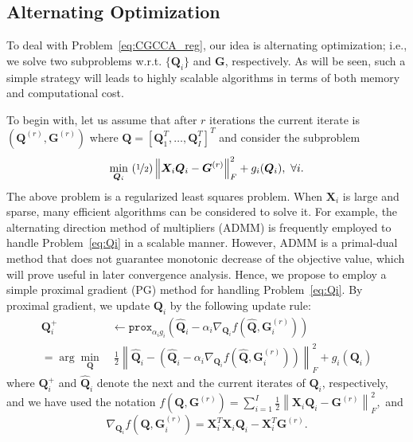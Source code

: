 \documentclass[10pt,journal]{IEEEtran}
\newcommand{\G}{\boldsymbol{G}}
\newcommand{\Q}{\boldsymbol{Q}}
\newcommand{\X}{\boldsymbol{X}}
\begin{document}
\subsection{Alternating Optimization}
To deal with Problem~\eqref{eq:CGCCA_reg}, our idea is alternating optimization; i.e.,
we solve two subproblems w.r.t. $\{\Q_i\}$ and $\G$, respectively.
As will be seen, such a simple strategy will leads to highly scalable algorithms in terms of both memory and computational cost.

To begin with, let us assume that after $r$ iterations the current iterate is $({\bm Q}^{(r)},\G^{(r)})$ where $\Q=[\Q_1^T,\ldots,\Q_I^T]^T$ and consider the subproblem
\begin{equation}\label{eq:Qi}
\min_{{\bm Q}_i}~(\nicefrac{1}{2})\left\|{\bm X}_i{\bm Q}_i-{\bm G}^{(r)}\right\|_F^2+ g_i(\Q_i),~\forall i.
\end{equation}
The above problem is a regularized least squares problem. When $\X_i$ is large and sparse,
many efficient algorithms can be considered to solve it. 
For example, the alternating direction method of multipliers (ADMM) \cite{Boyd11} is frequently employed to handle Problem~\eqref{eq:Qi} in a scalable manner.
However, ADMM is a primal-dual method that does not guarantee monotonic decrease of the objective value, which will prove useful in later convergence analysis.
Hence, we propose to employ a simple proximal gradient (PG) method for handling Problem~\eqref{eq:Qi}. By proximal gradient, we update $\Q_i$ by the following update rule:
\begin{align}\label{eq:prox_gradient_Q}
        {\bm Q}_i^{+} &\leftarrow \texttt{prox}_{\alpha_ig_i}\left(\hat{\Q}_i-\alpha_i \nabla_{\Q_i} f\left(\hat{\Q},\G_i^{(r)}\right)\right)\\
       = \arg\min_{\Q}&~\frac{1}{2}\left\|\hat{\Q}_i-\left(\hat{\Q}_i-\alpha_i \nabla_{\Q_i} f\left(\hat{\Q},\G_i^{(r)}\right)\right) \right\|_F^2+g_i({\bm Q}_i)\nonumber
\end{align}
where ${\bm Q}_i^{+} $ and $\hat{\bm Q}_i$ denote the 
next and the current iterates of ${\bm Q}_i$, respectively,
and we have used the notation $f(\Q,\G^{(r)}) = \sum_{i=1}^I\frac{1}{2}\left\|{\bm X}_i{\bm Q}_i-{\bm G}^{(r)}\right\|_F^2,$
and 
\begin{equation}\label{eq:grad_Q}
 \nabla_{\Q_i} f\left(\Q,\G_i^{(r)}\right)={\bm X}_i^T{\bm X}_i{\bm Q}_i- {\bm X}_i^T{\bm G}^{(r)}.
\end{equation}
\end{document}
